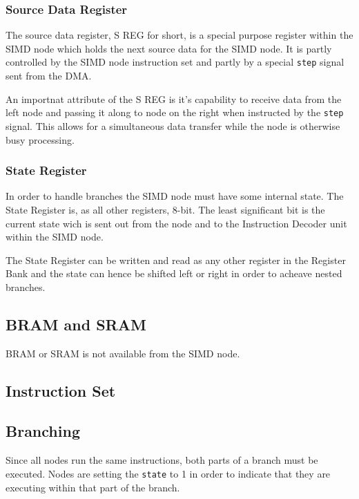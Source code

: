 \subsubsection{Source Data Register}
The source data register, S REG for short, is a special purpose register within
the SIMD node which holds the next source data for the SIMD node. It is partly controlled by the SIMD node instruction set and partly by a special {\tt step} signal sent from the DMA.

An importnat attribute of the S REG is it's capability to receive data from the left node and passing it along to node on the right when instructed by the {\tt step} signal. This allows for a simultaneous data transfer while the node is otherwise busy processing.

\subsubsection{State Register}
In order to handle branches the SIMD node must have some internal state. The State Register is, as all other registers, 8-bit. The least significant bit is the current state wich is sent out from the node and to the Instruction Decoder unit within the SIMD node.

The State Register can be written and read as any other register in the Register Bank and the state can hence be shifted left or right in order to acheave nested branches.

\subsection{BRAM and SRAM}


BRAM or SRAM is not available from the SIMD node.

\subsection{Instruction Set}



\subsection{Branching}

Since all nodes run the same instructions, both parts of a branch must be
executed. Nodes are setting the {\tt state} to 1 in order to indicate that they
are executing within that part of the branch.

